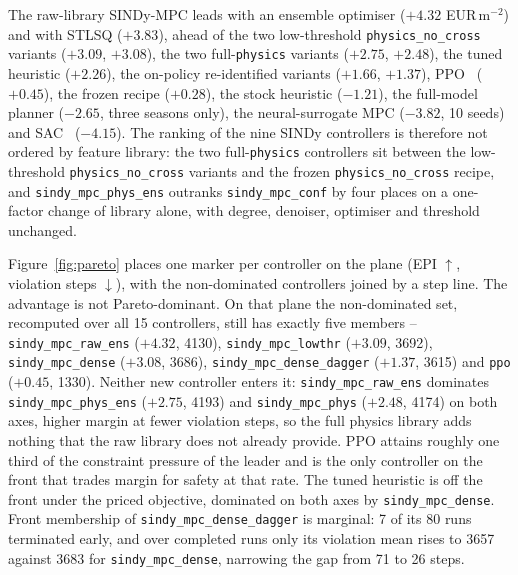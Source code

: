 The raw-library SINDy-MPC leads with an ensemble optimiser ($+4.32$ EUR\,m$^{-2}$) and with
STLSQ ($+3.83$), ahead of the two low-threshold \texttt{physics\_no\_cross} variants
($+3.09$, $+3.08$), the two full-\texttt{physics} variants ($+2.75$, $+2.48$), the tuned
heuristic ($+2.26$), the on-policy re-identified variants ($+1.66$, $+1.37$),
PPO~\cite{schulman2017} ($+0.45$), the frozen recipe ($+0.28$), the stock heuristic
($-1.21$), the full-model planner ($-2.65$, three seasons only), the neural-surrogate MPC
($-3.82$, 10 seeds) and SAC~\cite{haarnoja2018} ($-4.15$). The ranking of the nine SINDy
controllers is therefore not ordered by feature library: the two full-\texttt{physics}
controllers sit between the low-threshold \texttt{physics\_no\_cross} variants and the
frozen \texttt{physics\_no\_cross} recipe, and \texttt{sindy\_mpc\_phys\_ens} outranks
\texttt{sindy\_mpc\_conf} by four places on a one-factor change of library alone, with
degree, denoiser, optimiser and threshold unchanged.

Figure~\ref{fig:pareto} places one marker per controller on the plane
(EPI $\uparrow$, violation steps $\downarrow$), with the non-dominated controllers joined
by a step line. The advantage is not Pareto-dominant. On that plane the non-dominated set,
recomputed over all 15 controllers, still has
exactly five members -- \texttt{sindy\_mpc\_raw\_ens} ($+4.32$, 4130),
\texttt{sindy\_mpc\_lowthr} ($+3.09$, 3692), \texttt{sindy\_mpc\_dense} ($+3.08$, 3686),
\texttt{sindy\_mpc\_dense\_dagger} ($+1.37$, 3615) and \texttt{ppo} ($+0.45$, 1330).
Neither new controller enters it: \texttt{sindy\_mpc\_raw\_ens} dominates
\texttt{sindy\_mpc\_phys\_ens} ($+2.75$, 4193) and \texttt{sindy\_mpc\_phys} ($+2.48$,
4174) on both axes, higher margin at fewer violation steps, so the full physics
library adds nothing that the raw library does not already provide. PPO attains roughly
one third of the constraint pressure of the leader and is the only controller on the front
that trades margin for safety at that rate. The tuned heuristic is off the front
under the priced objective, dominated on both axes by \texttt{sindy\_mpc\_dense}. Front
membership of \texttt{sindy\_mpc\_dense\_dagger} is marginal: 7 of its 80 runs terminated
early, and over completed runs only its violation mean rises to 3657 against 3683 for
\texttt{sindy\_mpc\_dense}, narrowing the gap from 71 to 26 steps.

